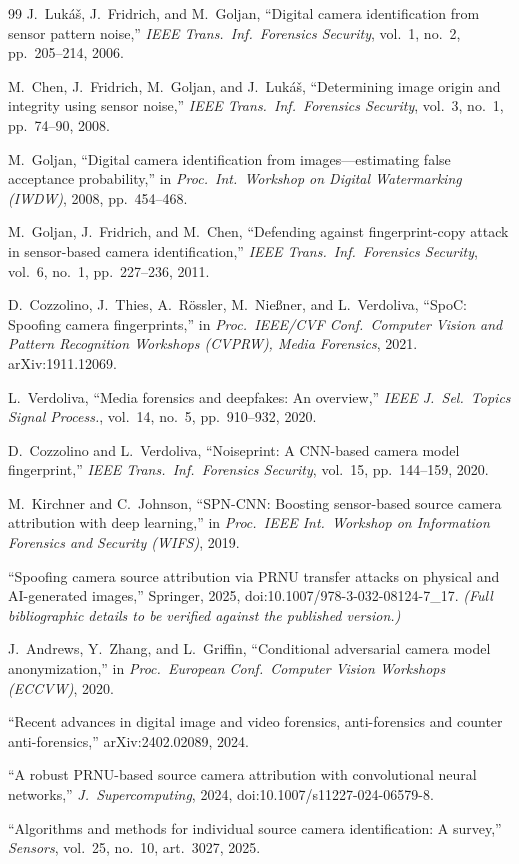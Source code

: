 \documentclass[11pt]{article}
\begin{document}
\begin{thebibliography}{99}
\small
{} J.~Luk\'a\v{s}, J.~Fridrich, and M.~Goljan,
``Digital camera identification from sensor pattern noise,''
\emph{IEEE Trans.\ Inf.\ Forensics Security}, vol.~1, no.~2, pp.~205--214, 2006.

 M.~Chen, J.~Fridrich, M.~Goljan, and J.~Luk\'a\v{s},
``Determining image origin and integrity using sensor noise,''
\emph{IEEE Trans.\ Inf.\ Forensics Security}, vol.~3, no.~1, pp.~74--90, 2008.

 M.~Goljan,
``Digital camera identification from images---estimating false acceptance
probability,'' in \emph{Proc.\ Int.\ Workshop on Digital Watermarking (IWDW)},
2008, pp.~454--468.

 M.~Goljan, J.~Fridrich, and M.~Chen,
``Defending against fingerprint-copy attack in sensor-based camera
identification,'' \emph{IEEE Trans.\ Inf.\ Forensics Security}, vol.~6, no.~1,
pp.~227--236, 2011.

 D.~Cozzolino, J.~Thies, A.~R\"ossler, M.~Nie\ss{}ner,
and L.~Verdoliva, ``SpoC: Spoofing camera fingerprints,'' in
\emph{Proc.\ IEEE/CVF Conf.\ Computer Vision and Pattern Recognition Workshops
(CVPRW), Media Forensics}, 2021. arXiv:1911.12069.

 L.~Verdoliva, ``Media forensics and deepfakes: An
overview,'' \emph{IEEE J.\ Sel.\ Topics Signal Process.}, vol.~14, no.~5,
pp.~910--932, 2020.

 D.~Cozzolino and L.~Verdoliva, ``Noiseprint: A
CNN-based camera model fingerprint,'' \emph{IEEE Trans.\ Inf.\ Forensics
Security}, vol.~15, pp.~144--159, 2020.

 M.~Kirchner and C.~Johnson, ``SPN-CNN: Boosting
sensor-based source camera attribution with deep learning,'' in \emph{Proc.\
IEEE Int.\ Workshop on Information Forensics and Security (WIFS)}, 2019.

``Spoofing camera source attribution via PRNU transfer attacks on physical and
AI-generated images,'' Springer, 2025, doi:10.1007/978-3-032-08124-7\_17.
\emph{(Full bibliographic details to be verified against the published version.)}

 J.~Andrews, Y.~Zhang, and L.~Griffin,
``Conditional adversarial camera model anonymization,'' in
\emph{Proc.\ European Conf.\ Computer Vision Workshops (ECCVW)}, 2020.

``Recent advances in digital image and video forensics, anti-forensics and
counter anti-forensics,'' arXiv:2402.02089, 2024.

``A robust PRNU-based source camera attribution with convolutional neural
networks,'' \emph{J.\ Supercomputing}, 2024, doi:10.1007/s11227-024-06579-8.

``Algorithms and methods for individual source camera identification: A survey,''
\emph{Sensors}, vol.~25, no.~10, art.~3027, 2025.
\end{thebibliography}
\end{document}
